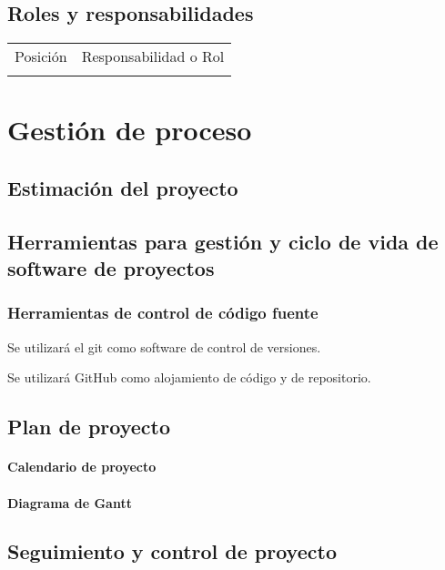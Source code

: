 \section{Roles y responsabilidades}
\begin{table}
\begin{tabular}{ll} \vline
Posición & Responsabilidad o Rol \\ \vline
\end{tabular}
\end{table}

\chapter*{Gestión de proceso}
\section{Estimación del proyecto}
\section{Herramientas para gestión y ciclo de vida de software de proyectos}
\subsection{Herramientas de control de código fuente}
Se utilizará el git como software de control de versiones. 

Se utilizará GitHub como alojamiento de código y de repositorio.
\section{Plan de proyecto}
\subsubsection{Calendario de proyecto}
\subsubsection{Diagrama de Gantt}

\section{Seguimiento y control de proyecto}


